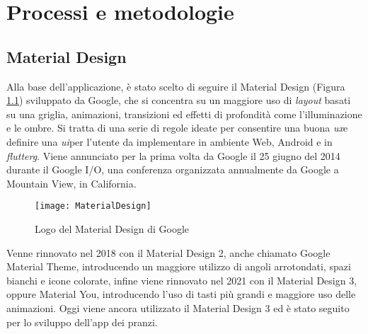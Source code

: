 \chapter{Processi e metodologie}
\label{cap:processi-metodologie}


\section{Material Design}
Alla base dell'applicazione, è stato scelto di seguire il Material Design (Figura \ref{fig:material}) sviluppato da Google, che si concentra su un maggiore uso di \emph{layout} basati su una griglia, animazioni, transizioni ed effetti di profondità come l'illuminazione e le ombre.\newline
Si tratta di una serie di regole ideate per consentire una buona \emph{\gls{ux}}\glsfirstoccur e definire una \emph{\gls{ui}}\glsfirstoccur per l'utente da implementare in ambiente Web, Android e in \emph{\gls{flutterg}}.\newline
Viene annunciato per la prima volta da Google il 25 giugno del 2014 durante il Google I/O, una conferenza organizzata annualmente da Google a Mountain View, in California.\newline
\begin{figure}[!h] 
    \centering 
    \texttt{[image: MaterialDesign]} 
    \caption{Logo del Material Design di Google}\label{fig:material}
\end{figure}
\newline
Venne rinnovato nel 2018 con il Material Design 2, anche chiamato Google Material Theme, introducendo un maggiore utilizzo di angoli arrotondati, spazi bianchi e icone colorate, infine viene rinnovato nel 2021 con il Material Design 3, oppure Material You, introducendo l'uso di tasti più grandi e maggiore uso delle animazioni.\newline
Oggi viene ancora utilizzato il Material Design 3 ed è stato seguito per lo sviluppo dell'app dei pranzi.\newline
